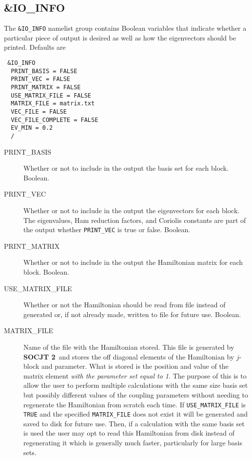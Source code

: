 \documentclass{article}
\newcommand{\socjttwo}{{\bf SOCJT 2}}
\begin{document}
\subsection{\&IO\_INFO}

The {\tt \&IO\_INFO} namelist group contains Boolean variables that
indicate whether a particular piece of output is desired as well
as how the eigenvectors should be printed. Defaults are

\begin{verbatim}
 &IO_INFO
  PRINT_BASIS = FALSE
  PRINT_VEC = FALSE
  PRINT_MATRIX = FALSE
  USE_MATRIX_FILE = FALSE
  MATRIX_FILE = matrix.txt
  VEC_FILE = FALSE
  VEC_FILE_COMPLETE = FALSE
  EV_MIN = 0.2
  /
\end{verbatim}

\begin{description}

\item[PRINT\_BASIS] Whether or not to include in the output the basis
  set for each block. Boolean.

\item[PRINT\_VEC] Whether or not to include in the output the eigenvectors
  for each block. The eigenvalues, Ham reduction factors, and Coriolis
  constants are part of the output whether {\tt PRINT\_VEC} is true or
  false. Boolean.

\item[PRINT\_MATRIX] Whether or not to include in the output the Hamiltonian
  matrix for each block. Boolean.
  
  \item[USE\_MATRIX\_FILE] Whether or not the Hamiltonian should be read from file instead of generated or, if not already made, written to file for future use. Boolean.
  
  \item[MATRIX\_FILE] Name of the file with the Hamiltonian stored. This file is generated by \socjttwo\ and stores the off diagonal elements of the Hamiltonian by $j$-block and parameter. What is stored is the position and value of the matrix element \emph{with the parameter set equal to 1}. The purpose of this is to allow the user to perform multiple calculations with the same size basis set but possibly different values of the coupling parameters without needing to regenerate the Hamiltonian from scratch each time. If {\tt USE\_MATRIX\_FILE} is {\tt TRUE} and the specified {\tt MATRIX\_FILE} does not exist it will be generated and saved to disk for future use. Then, if a calculation with the same basis set is used the user may opt to read this Hamiltonian from disk instead of regenerating it which is generally much faster, particularly for large basis sets. 
  

\end{description}
\end{document}
